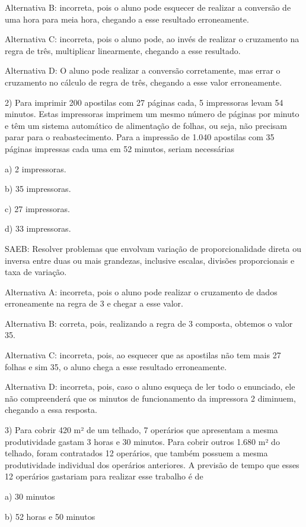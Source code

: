 Alternativa B: incorreta, pois o aluno pode esquecer de realizar a
conversão de uma hora para meia hora, chegando a esse resultado
erroneamente.

Alternativa C: incorreta, pois o aluno pode, ao invés de realizar o
cruzamento na regra de três, multiplicar linearmente, chegando a esse
resultado.

Alternativa D: O aluno pode realizar a conversão corretamente, mas errar
o cruzamento no cálculo de regra de três, chegando a esse valor
erroneamente.

2) Para imprimir 200 apostilas com 27 páginas cada, 5 impressoras levam
54 minutos. Estas impressoras imprimem um mesmo número de páginas por
minuto e têm um sistema automático de alimentação de folhas, ou seja,
não precisam parar para o reabastecimento. Para a impressão de 1.040
apostilas com 35 páginas impressas cada uma em 52 minutos, seriam
necessárias

a) 2 impressoras.

b) 35 impressoras.

c) 27 impressoras.

d) 33 impressoras.

SAEB: Resolver problemas que envolvam variação de proporcionalidade
direta ou inversa entre duas ou mais grandezas, inclusive escalas,
divisões proporcionais e taxa de variação.

Alternativa A: incorreta, pois o aluno pode realizar o cruzamento de
dados erroneamente na regra de 3 e chegar a esse valor.

Alternativa B: correta, pois, realizando a regra de 3 composta, obtemos
o valor 35.

Alternativa C: incorreta, pois, ao esquecer que as apostilas não tem
mais 27 folhas e sim 35, o aluno chega a esse resultado erroneamente.

Alternativa D: incorreta, pois, caso o aluno esqueça de ler todo o
enunciado, ele não compreenderá que os minutos de funcionamento da
impressora 2 diminuem, chegando a essa resposta.

3) Para cobrir 420 m² de um telhado, 7 operários que apresentam a mesma
produtividade gastam 3 horas e 30 minutos. Para cobrir outros 1.680 m²
do telhado, foram contratados 12 operários, que também possuem a mesma
produtividade individual dos operários anteriores. A previsão de tempo
que esses 12 operários gastariam para realizar esse trabalho é de

a) 30 minutos

b) 52 horas e 50 minutos

